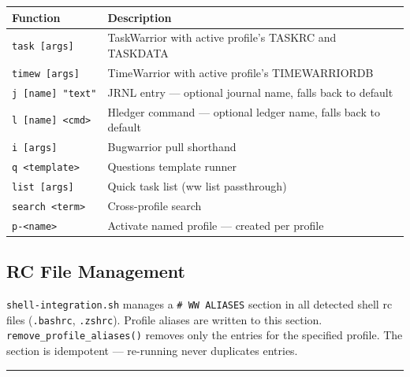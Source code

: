 \documentclass[
]{article}
\newcounter{none} %
\begin{document}
{\def\LTcaptype{none} %
\begin{longtable}[]{@{}
  >{\raggedright\arraybackslash}p{}
  >{\raggedright\arraybackslash}p{}@{}}
\toprule\noalign{}
\begin{minipage}[b]{\linewidth}\raggedright
Function
\end{minipage} & \begin{minipage}[b]{\linewidth}\raggedright
Description
\end{minipage} \\
\midrule\noalign{}
\endhead
\bottomrule\noalign{}
\endlastfoot
\texttt{task\ {[}args{]}} & TaskWarrior with active profile's TASKRC and
TASKDATA \\
\texttt{timew\ {[}args{]}} & TimeWarrior with active profile's
TIMEWARRIORDB \\
\texttt{j\ {[}name{]}\ "text"} & JRNL entry --- optional journal name,
falls back to default \\
\texttt{l\ {[}name{]}\ \textless{}cmd\textgreater{}} & Hledger command
--- optional ledger name, falls back to default \\
\texttt{i\ {[}args{]}} & Bugwarrior pull shorthand \\
\texttt{q\ \textless{}template\textgreater{}} & Questions template
runner \\
\texttt{list\ {[}args{]}} & Quick task list (ww list passthrough) \\
\texttt{search\ \textless{}term\textgreater{}} & Cross-profile search \\
\texttt{p-\textless{}name\textgreater{}} & Activate named profile ---
created per profile \\
\end{longtable}
}

\subsection{RC File Management}\label{rc-file-management}

\texttt{shell-integration.sh} manages a \texttt{\#\ WW\ ALIASES} section
in all detected shell rc files (\texttt{.bashrc}, \texttt{.zshrc}).
Profile aliases are written to this section.
\texttt{remove\_profile\_aliases()} removes only the entries for the
specified profile. The section is idempotent --- re-running never
duplicates entries.

\begin{center}\rule{0.5\linewidth}{0.5pt}\end{center}
\end{document}
